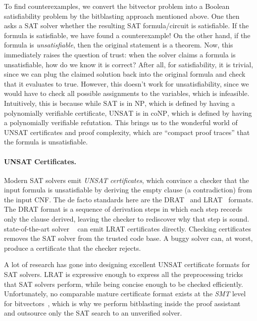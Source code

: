 To find counterexamples, we convert the bitvector problem into a Boolean satisfiability problem by the bitblasting approach mentioned above.
One then asks a SAT solver whether the resulting SAT formula/circuit is satisfiable.
If the formula is satisfiable, we have found a counterexample!
On the other hand, if the formula is \emph{unsatisfiable}, then the original statement is a theorem.
Now, this immediately raises the question of trust: when the solver claims a formula is unsatisfiable, how do we know it is correct?
After all, for satisfiability, it is trivial, since we can plug the claimed solution back into the original formula and check that it evaluates to true.
However, this doesn't work for unsatisfiability, since we would have to check all possible assignments to the variables, which is infeasible.
Intuitively, this is because while $\mathrm{SAT}$ is in $\mathrm{NP}$, which is defined by having a polynomially verifiable certificate,
$\mathrm{UNSAT}$ is in $\mathrm{coNP}$, which is defined by having a polynomially verifiable refutation.
This brings us to the wonderful world of UNSAT certificates and proof complexity,
which are ``compact proof traces'' that the formula is unsatisfiable.

\paragraph*{UNSAT Certificates.}

Modern SAT solvers emit \emph{UNSAT certificates},
which convince a checker that the input formula is unsatisfiable by deriving the empty clause (a contradiction) from the input CNF.
The de facto standards here are the DRAT~\citep{heule2016drat} and LRAT~\citep{cruz2017efficient} formats.
The DRAT format is a sequence of derivation steps
in which each step records only the clause derived,
leaving the checker to rediscover why that step is sound.
state-of-the-art solver \cadical{}~\citep{biere2024cadical} can emit LRAT
certificates directly.
Checking certificates removes the SAT solver from the trusted code base.
A buggy solver can, at worst, produce a certificate that the checker rejects.

A lot of research has gone into designing excellent UNSAT certificate formats for SAT solvers.
LRAT is expressive enough to express all the preprocessing tricks that SAT solvers perform,
while being concise enough to be checked efficiently.
Unfortunately, no comparable mature certificate format exists at the \emph{SMT} level for bitvectors~\citep{barrett2015proofs},
which is why we perform bitblasting inside the proof assistant and outsource only the SAT search to an unverified solver.

